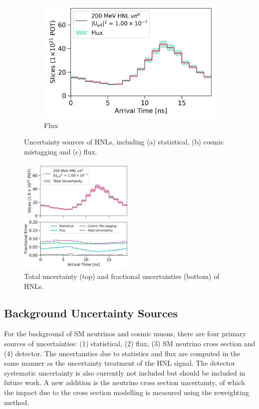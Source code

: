 \begin{figure}[htbp!]
\begin{subfigure}[b]{0.495\textwidth}
            \includegraphics[width=\textwidth]{hnl_flux_error}
            \caption{Flux}%
            \label{fig:hnl_flux}
        \end{subfigure}
        \caption{
	Uncertainty sources of HNLs, including (a) statistical, (b) cosmic mistagging and (c) flux.
	}
        \label{fig:hnl_error}
	\vspace{0.5cm}
\centering    
\includegraphics[width=0.5\textwidth]{hnl_error}
\caption[hnl error]{
Total uncertainty (top) and fractional uncertainties (bottom) of HNLs.
}
\label{fig:hnl_total_error}
\end{figure}

\subsection{Background Uncertainty Sources}
\label{sec:bkg_error}

For the background of SM neutrinos and cosmic muons, there are four primary sources of uncertainties: (1) statistical, (2) flux, (3) SM neutrino cross section and (4) detector.
The uncertainties due to statistics and flux are computed in the same manner as the uncertainty treatment of the HNL signal.
The detector systematic uncertainty is also currently not included but should be included in future work.
A new addition is the neutrino cross section uncertainty, of which the impact due to the cross section modelling 
is measured using the reweighting method.

